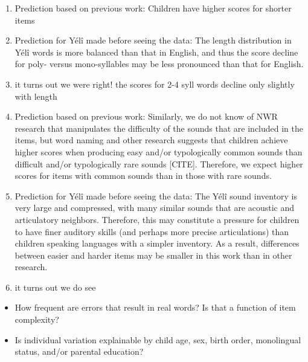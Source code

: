 \documentclass[english,,man,floatsintext]{apa6}
\providecommand{\tightlist}{%
  \setlength{\itemsep}{0pt}\setlength{\parskip}{0pt}}
\begin{document}
\begin{enumerate}
\def\labelenumi{\arabic{enumi}.}
\item
  Prediction based on previous work: Children have higher scores for
  shorter items
\item
  Prediction for Yélî made before seeing the data: The length
  distribution in Yélî words is more balanced than that in English, and
  thus the score decline for poly- versus mono-syllables may be less
  pronounced than that for English.
\item
  it turns out we were right! the scores for 2-4 syll words decline only
  slightly with length
\item
  Prediction based on previous work: Similarly, we do not know of NWR
  research that manipulates the difficulty of the sounds that are
  included in the items, but word naming and other research suggests
  that children achieve higher scores when producing easy and/or
  typologically common sounds than difficult and/or typologically rare
  sounds {[}CITE{]}. Therefore, we expect higher scores for items with
  common sounds than in those with rare sounds.
\item
  Prediction for Yélî made before seeing the data: The Yélî sound
  inventory is very large and compressed, with many similar sounds that
  are acoustic and articulatory neighbors. Therefore, this may
  constitute a pressure for children to have finer auditory skills (and
  perhaps more precise articulations) than children speaking languages
  with a simpler inventory. As a result, differences between easier and
  harder items may be smaller in this work than in other research.
\item
  it turns out we do see
\end{enumerate}

\begin{itemize}
\tightlist
\item
  How frequent are errors that result in real words? Is that a function
  of item complexity?
\item
  Is individual variation explainable by child age, sex, birth order,
  monolingual status, and/or parental education?
\end{itemize}
\end{document}
